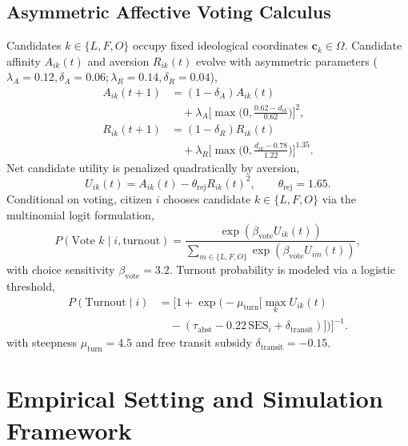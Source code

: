 \documentclass[a4paper,fleqn]{cas-dc}
\begin{document}
\subsection{Asymmetric Affective Voting Calculus}
\label{subsec:voting_calculus}
Candidates $k \in \{L, F, O\}$ occupy fixed ideological coordinates $\mathbf{c}_k \in \Omega$. Candidate affinity $A_{ik}(t)$ and aversion $R_{ik}(t)$ evolve with asymmetric parameters ($\lambda_A = 0.12, \delta_A = 0.06; \lambda_R = 0.14, \delta_R = 0.04$),
\begin{align}
    A_{ik}(t+1) &= (1 - \delta_A) A_{ik}(t) \nonumber \\
    &\quad + \lambda_A \Big[\max\!\Big(0, \frac{0.62 - d_{ik}}{0.62}\Big)\Big]^2, \label{eq:methods_adm} \\
    R_{ik}(t+1) &= (1 - \delta_R) R_{ik}(t) \nonumber \\
    &\quad + \lambda_R \Big[\max\!\Big(0, \frac{d_{ik} - 0.78}{1.22}\Big)\Big]^{1.35}. \label{eq:methods_rej}
\end{align}
Net candidate utility is penalized quadratically by aversion,
\begin{equation}
    U_{ik}(t) = A_{ik}(t) - \theta_{\mathrm{rej}} R_{ik}(t)^2, \qquad \theta_{\mathrm{rej}} = 1.65.
    \label{eq:methods_utility}
\end{equation}
Conditional on voting, citizen $i$ chooses candidate $k \in \{L, F, O\}$ via the multinomial logit formulation,
\begin{equation}
    P(\text{Vote } k \mid i, \text{turnout}) = \frac{\exp(\beta_{\mathrm{vote}} U_{ik}(t))}{\sum_{m \in \{L, F, O\}} \exp(\beta_{\mathrm{vote}} U_{im}(t))},
    \label{eq:methods_logit}
\end{equation}
with choice sensitivity $\beta_{\mathrm{vote}} = 3.2$. Turnout probability is modeled via a logistic threshold,
\begin{equation}
\begin{aligned}
    P(\text{Turnout} \mid i) &= \Big[1 + \exp\!\big(-\mu_{\mathrm{turn}}\big[\max_k U_{ik}(t) \\
    &\quad - (\tau_{\mathrm{abst}} - 0.22\,\mathrm{SES}_i + \delta_{\mathrm{transit}})\big]\big)\Big]^{-1}.
\end{aligned}
\label{eq:methods_turnout}
\end{equation}
with steepness $\mu_{\mathrm{turn}} = 4.5$ and free transit subsidy $\delta_{\mathrm{transit}} = -0.15$.

\section{Empirical Setting and Simulation Framework}
\label{sec:empirical_setting}
\end{document}
